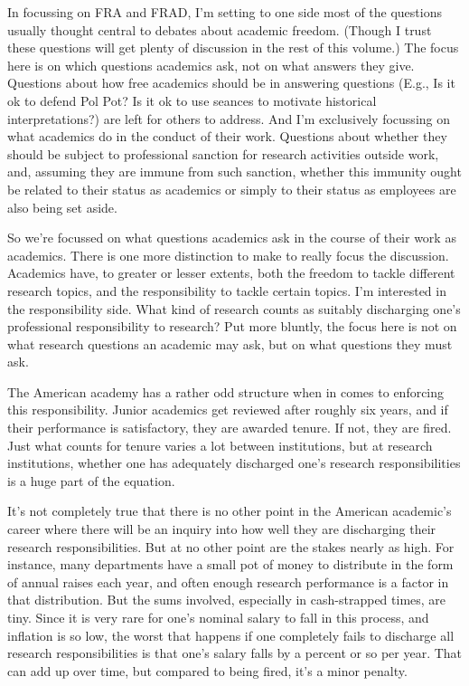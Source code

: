 \documentclass[
  11pt,
  letterpaper,
  DIV=11,
  numbers=noendperiod,
  twoside]{scrartcl}
\begin{document}
In focussing on FRA and FRAD, I'm setting to one side most of the
questions usually thought central to debates about academic freedom.
(Though I trust these questions will get plenty of discussion in the
rest of this volume.) The focus here is on which questions academics
ask, not on what answers they give. Questions about how free academics
should be in answering questions (E.g., Is it ok to defend Pol Pot? Is
it ok to use seances to motivate historical interpretations?) are left
for others to address. And I'm exclusively focussing on what academics
do in the conduct of their work. Questions about whether they should be
subject to professional sanction for research activities outside work,
and, assuming they are immune from such sanction, whether this immunity
ought be related to their status as academics or simply to their status
as employees are also being set aside.

So we're focussed on what questions academics ask in the course of their
work as academics. There is one more distinction to make to really focus
the discussion. Academics have, to greater or lesser extents, both the
freedom to tackle different research topics, and the responsibility to
tackle certain topics. I'm interested in the responsibility side. What
kind of research counts as suitably discharging one's professional
responsibility to research? Put more bluntly, the focus here is not on
what research questions an academic may ask, but on what questions they
must ask.

The American academy has a rather odd structure when in comes to
enforcing this responsibility. Junior academics get reviewed after
roughly six years, and if their performance is satisfactory, they are
awarded tenure. If not, they are fired. Just what counts for tenure
varies a lot between institutions, but at research institutions, whether
one has adequately discharged one's research responsibilities is a huge
part of the equation.

It's not completely true that there is no other point in the American
academic's career where there will be an inquiry into how well they are
discharging their research responsibilities. But at no other point are
the stakes nearly as high. For instance, many departments have a small
pot of money to distribute in the form of annual raises each year, and
often enough research performance is a factor in that distribution. But
the sums involved, especially in cash-strapped times, are tiny. Since it
is very rare for one's nominal salary to fall in this process, and
inflation is so low, the worst that happens if one completely fails to
discharge all research responsibilities is that one's salary falls by a
percent or so per year. That can add up over time, but compared to being
fired, it's a minor penalty.
\end{document}
